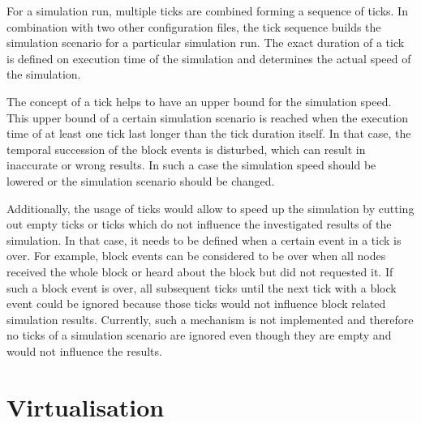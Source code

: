 For a simulation run, multiple ticks are combined forming a sequence of ticks.
In combination with two other configuration files, the tick sequence builds the simulation scenario for a particular simulation run.
The exact duration of a tick is defined on execution time of the simulation and determines the actual speed of the simulation.

The concept of a tick helps to have an upper bound for the simulation speed.
This upper bound of a certain simulation scenario is reached when the execution time of at least one tick last longer than the tick duration itself.
In that case, the temporal succession of the block events is disturbed, which can result in inaccurate or wrong results.
In such a case the simulation speed should be lowered or the simulation scenario should be changed.

Additionally, the usage of ticks would allow to speed up the simulation by cutting out empty ticks or ticks which do not influence the investigated results of the simulation.
In that case, it needs to be defined when a certain event in a tick is over.
For example, block events can be considered to be over when all nodes received the whole block or heard about the block but did not requested it.
If such a block event is over, all subsequent ticks until the next tick with a block event could be ignored because those ticks would not influence block related simulation results.
Currently, such a mechanism is not implemented and therefore no ticks of a simulation scenario are ignored even though they are empty and would not influence the results.


\section{Virtualisation}
\label{chap:virtualisation}

